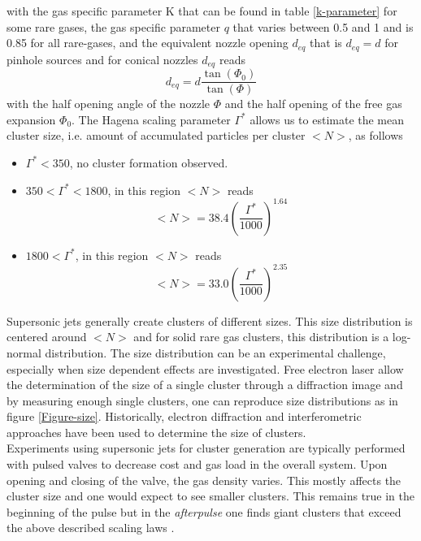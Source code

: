 with the gas specific parameter K that can be found in table \ref{k-parameter} for some rare gases, the gas specific parameter $q$ that varies between 0.5 and 1 and is 0.85 for all rare-gases, and the equivalent nozzle opening $d_{eq}$ that is $d_{eq}=d$ for pinhole sources and for conical nozzles $d_{eq}$ reads
\begin{equation}
d_{eq} = d\frac{\tan\left(\Phi_{0}\right)}{\tan\left(\Phi\right)}
\label{eq:equivalent-nozzle-opening}
\end{equation}
with the half opening angle of the nozzle $\Phi$ and the half opening of the free gas expansion $\Phi_{0}$. The Hagena scaling parameter $\Gamma^{*}$ allows us to estimate the mean cluster size, i.e. amount of accumulated particles per cluster $<N>$, as follows
\begin{itemize}
	\item $\Gamma^{*} < 350$, no cluster formation observed.
	\item $350 < \Gamma^{*} < 1800$, in this region $<N>$ reads
		\begin{equation}
		<N> = 38.4 \left(\frac{\Gamma^{*}}{1000}\right)^{1.64}
		\label{eq:intermediate-hagena-scaling}
		\end{equation}
	\item $1800 < \Gamma^{*}$, in this region $<N>$ reads
		\begin{equation}
		<N> = 33.0 \left(\frac{\Gamma^{*}}{1000}\right)^{2.35}
		\label{eq:}
		\end{equation}
\end{itemize}
Supersonic jets generally create clusters of different sizes. This size distribution is centered around $<N>$ and for solid rare gas clusters, this distribution is a log-normal distribution. The size distribution can be an experimental challenge, especially when size dependent effects are investigated. Free electron laser allow the determination of the size of a single cluster through a diffraction image and by measuring enough single clusters, one can reproduce size distributions as in figure \ref{Figure-size}. Historically, electron diffraction \cite{TBD} and interferometric approaches \cite{TBD} have been used to determine the size of clusters.\\
Experiments using supersonic jets for cluster generation are typically performed with pulsed valves to decrease cost and gas load in the overall system. Upon opening and closing of the valve, the gas density varies. This mostly affects the cluster size and one would expect to see smaller clusters. This remains true in the beginning of the pulse but in the \textit{afterpulse} one finds giant clusters that exceed the above described scaling laws \cite{Rupp-2014-JCP}.
%
%
%
%
%
